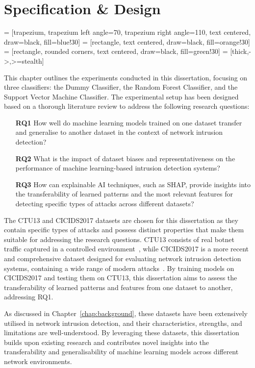 \chapter{Specification \& Design}\label{chap:specification-design}

 = [trapezium, trapezium left angle=70, trapezium right angle=110, text centered, draw=black, fill=blue!30]
 = [rectangle, text centered, draw=black, fill=orange!30]
 = [rectangle, rounded corners, text centered, draw=black, fill=green!30]
 = [thick,->,>=stealth]

This chapter outlines the experiments conducted in this dissertation, focusing on three classifiers: the Dummy Classifier, the Random Forest Classifier, and the Support Vector Machine Classifier. The experimental setup has been designed based on a thorough literature review to address the following research questions:

\begin{enumerate}
\item[\textbf{RQ1}] How well do machine learning models trained on one dataset transfer and generalise to another dataset in the context of network intrusion detection?
\item[\textbf{RQ2}] What is the impact of dataset biases and representativeness on the performance of machine learning-based intrusion detection systems?
\item[\textbf{RQ3}] How can explainable AI techniques, such as SHAP, provide insights into the transferability of learned patterns and the most relevant features for detecting specific types of attacks across different datasets?
\end{enumerate}

The CTU13 and CICIDS2017 datasets are chosen for this dissertation as they contain specific types of attacks and possess distinct properties that make them suitable for addressing the research questions. CTU13 consists of real botnet traffic captured in a controlled environment~\cite{garcia2014empirical}, while CICIDS2017 is a more recent and comprehensive dataset designed for evaluating network intrusion detection systems, containing a wide range of modern attacks~\cite{sharafaldin2018toward}. By training models on CICIDS2017 and testing them on CTU13, this dissertation aims to assess the transferability of learned patterns and features from one dataset to another, addressing RQ1.

As discussed in Chapter~\ref{chap:background}, these datasets have been extensively utilised in network intrusion detection, and their characteristics, strengths, and limitations are well-understood. By leveraging these datasets, this dissertation builds upon existing research and contributes novel insights into the transferability and generalisability of machine learning models across different network environments.

